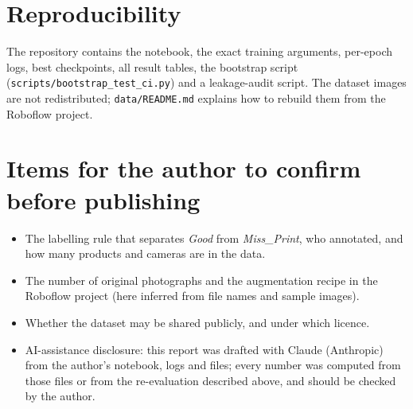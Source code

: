 \documentclass[11pt,a4paper]{article}
\begin{document}
\section*{Reproducibility}
The repository contains the notebook, the exact training arguments, per-epoch logs, best checkpoints, all result tables, the bootstrap script (\texttt{scripts/bootstrap\_test\_ci.py}) and a leakage-audit script. The dataset images are not redistributed; \texttt{data/README.md} explains how to rebuild them from the Roboflow project.

\section*{Items for the author to confirm before publishing}
\begin{itemize}[leftmargin=1.4em,itemsep=1pt]
  \item The labelling rule that separates \emph{Good} from \emph{Miss\_Print}, who annotated, and how many products and cameras are in the data.
  \item The number of original photographs and the augmentation recipe in the Roboflow project (here inferred from file names and sample images).
  \item Whether the dataset may be shared publicly, and under which licence.
  \item AI-assistance disclosure: this report was drafted with Claude (Anthropic) from the author's notebook, logs and files; every number was computed from those files or from the re-evaluation described above, and should be checked by the author.
\end{itemize}

\appendix
\end{document}

